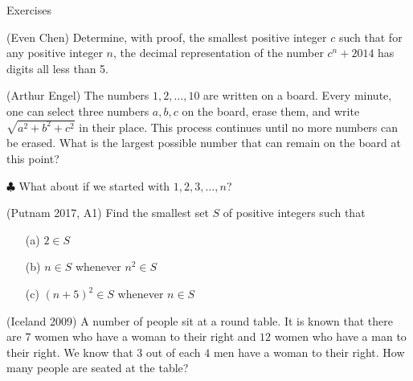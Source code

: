 \begin{xcb}{Exercises}
\begin{exc}
\item (Even Chen)  Determine, with proof, the smallest positive integer 
\(c\) such that for any positive integer \(n\), the decimal representation of the number 
\(c^n+2014\) has digits all less than 5.
\begin{hint}
\end{hint}

\item (Arthur Engel)  The numbers \(1, 2, \dots, 10\) are written on a board. 
Every minute, one can select three numbers \(a, b, c\) on the board, erase them, and write 
\(\sqrt{a^2+b^2+c^2}\) in their place. 
This process continues until no more numbers can be erased. 
What is the largest possible number that can remain on the board at this point? 

\(\clubsuit\) What about if we started with \(1, 2, 3, \ldots, n\)?
\begin{hint}
\end{hint}

\item (Putnam 2017, A1)  Find the smallest set \(S\) of positive integers such that
\begin{enumerate}
    \item[(a)] \(2 \in S\)
    \item[(b)] \(n \in S\) whenever \(n^2 \in S\)
    \item[(c)] \((n+5)^2 \in S\) whenever \(n \in S\) 
\end{enumerate}

\begin{hint}
\end{hint}

\item  (Iceland 2009)  A number of people sit at a round table. 
It is known that there are \(7\) women who have a woman to their right and 
\(12\) women who have a man to their right. 
We know that \(3\) out of each \(4\) men have a woman to their right. 
How many people are seated at the table?
\begin{hint}
\end{hint}
\end{exc}
\end{xcb}

